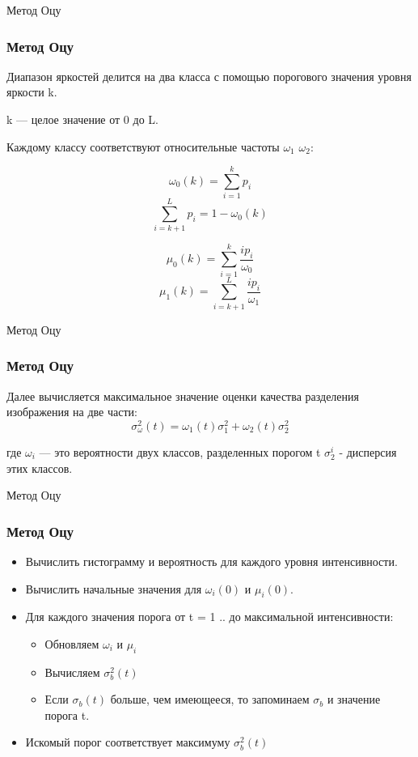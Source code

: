 \documentclass{beamer}
\begin{document}
\begin{frame}{Метод Оцу}
\frametitle{Метод Оцу}
  Диапазон яркостей делится на два класса с помощью порогового значения уровня яркости k.
  
  k — целое значение от 0 до L. 
  
  Каждому классу соответствуют относительные частоты $\omega_{1}$ $\omega_{2}$:
  
  $$ \omega_{0}(k) = \sum_{i=1}^{k} p_{i} $$
  $$ \sum_{i=k+1}^{L} p_{i} = 1 - \omega _{0} (k) $$
  
  $$\mu _{0}(k) = \sum_{i=1}^{k} \frac{ip_{i}}{\omega _{0}} $$
  $$\mu _{1}(k) = \sum_{i=k+1}^{L} \frac{ip_{i}}{\omega _{1}} $$
\end{frame}





\begin{frame}{Метод Оцу}
\frametitle{Метод Оцу}
Далее вычисляется максимальное значение оценки качества разделения изображения на две части:
$$\sigma  _{\omega}^{2} (t)  = \omega _{1}(t) \sigma _{1}^{2} + \omega _{2}(t) \sigma _{2}^{2}$$

где $\omega _{i}$ — это вероятности двух классов, разделенных порогом t
$\sigma _{2}^{i}$ - дисперсия этих классов.
\end{frame}






\begin{frame}{Метод Оцу}
\frametitle{Метод Оцу}
	\begin{itemize}
		\item Вычислить гистограмму и вероятность для каждого уровня интенсивности.
 		\item Вычислить начальные значения для $\omega _{i} (0)$ и $\mu  _{i} (0)$.
  		\item Для каждого значения порога от t = 1 .. до максимальной интенсивности:
  		\begin{itemize}
  			\item Обновляем $\omega _{i}$ и $\mu _{i}$ 
  			\item Вычисляем $\sigma _{b}^{2} (t)$
  			\item Если $\sigma _{b} (t)$ больше, чем имеющееся, то запоминаем $\sigma _{b}$ и значение порога t.
  		\end{itemize}
  		\item Искомый порог соответствует максимуму $\sigma _{b}^{2} (t)$
	\end{itemize}
\end{frame}
\end{document}

